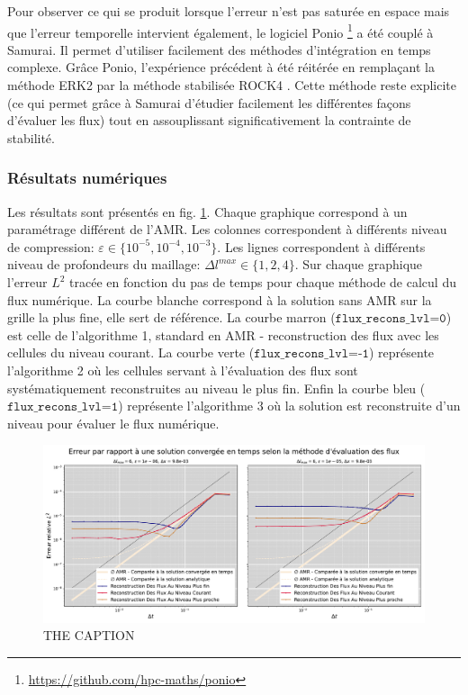 \label{par:etude_diff_rock4}
Pour observer ce qui se produit lorsque l'erreur n'est pas saturée en espace mais que l'erreur temporelle intervient également, 
le logiciel Ponio \footnote{\href{https://github.com/hpc-maths/ponio}{https://github.com/hpc-maths/ponio}} a été couplé à Samurai.
Il permet d'utiliser facilement des méthodes d'intégration en temps complexe. 
Grâce Ponio, l’expérience précédent à été réitérée en remplaçant la méthode ERK2 par la méthode stabilisée ROCK4 \cite{AbdulleMedovikov2001}. 
Cette méthode reste explicite (ce qui permet grâce à Samurai d'étudier facilement les différentes façons d'évaluer les flux) 
tout en assouplissant significativement la contrainte de stabilité.
\subsubsection{Résultats numériques}
    Les résultats sont présentés en fig. \ref{fig:convergence_diffusion_rok4}. Chaque graphique correspond à un paramétrage différent de l'AMR. 
    Les colonnes correspondent à différents niveau de compression: $\varepsilon \in \{10^{-5}, 10^{-4}, 10^{-3}\}$.
    Les lignes correspondent à différents niveau de profondeurs du maillage: $\Delta l^{max} \in \{1,2,4\}$.
    Sur chaque graphique l'erreur $L^2$ tracée en fonction du pas de temps pour chaque méthode de calcul du flux numérique.
    La courbe blanche correspond à la solution sans AMR sur la grille la plus fine, elle sert de référence.
    La courbe marron ($\texttt{flux\_recons\_lvl=0}$) est celle de l'algorithme 1, standard en AMR - reconstruction des flux avec les cellules du niveau courant.
    La courbe verte  ($\texttt{flux\_recons\_lvl=-1}$) représente l’algorithme 2 où les cellules servant à l'évaluation des flux sont systématiquement reconstruites au niveau le plus fin.
    Enfin la courbe bleu ($\texttt{flux\_recons\_lvl=1}$) représente l'algorithme 3 où la solution est reconstruite d'un niveau pour évaluer le flux numérique.

\begin{figure}[h!]
    \centering
    \includegraphics[width=\textwidth]{media/4_travail/3/flux_reconstruction_method_diffusion.pdf}
    \caption{THE CAPTION}
    \label{fig:convergence_diffusion_rok4}
\end{figure}

